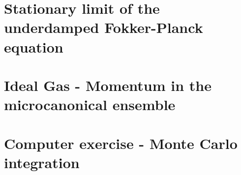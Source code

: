 \documentclass[11 pt]{article}
\begin{document}
    \section{Stationary limit of the underdamped Fokker-Planck equation}
    

    \newpage
    \section{Ideal Gas - Momentum in the microcanonical ensemble}
    

    \newpage
    \section{Computer exercise - Monte Carlo integration}
    
\end{document}
